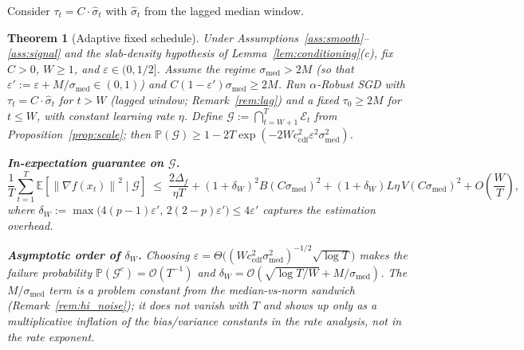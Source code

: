 \documentclass[11pt]{article}
\newtheorem{theorem}{Theorem}
\theoremstyle{definition}
\newcommand{\E}{\mathbb{E}}
\newcommand{\Prob}{\mathbb{P}}
\newcommand{\norm}[1]{\left\| #1 \right\|}
\newcommand{\shat}{\hat{\sigma}}
\begin{document}
Consider $\tau_t = C \cdot \shat_t$ with $\shat_t$ from the lagged median window.

\begin{theorem}[Adaptive fixed schedule]\label{thm:adaptive}
Under Assumptions~\ref{ass:smooth}--\ref{ass:signal} and the slab-density
hypothesis of Lemma~\ref{lem:conditioning}\textup{(c)}, fix $C > 0$, $W \geq 1$,
and $\varepsilon \in (0, 1/2]$. Assume the regime $\sigma_{\mathrm{med}} > 2M$
\textup{(}so that $\varepsilon' := \varepsilon + M/\sigma_{\mathrm{med}} \in (0, 1)$\textup{)}
and $C(1-\varepsilon')\sigma_{\mathrm{med}} \geq 2M$. Run $\alpha$-Robust SGD
with $\tau_t = C \cdot \shat_t$ for $t > W$ \textup{(}lagged window;
Remark~\ref{rem:lag}\textup{)} and a fixed $\tau_0 \geq 2M$ for $t \leq W$,
with constant learning rate $\eta$. Define
$\mathcal G := \bigcap_{t=W+1}^T \mathcal E_t$ from Proposition~\ref{prop:scale};
then $\Prob(\mathcal G) \geq 1 - 2T\exp(-2W c_{\mathrm{cdf}}^2 \varepsilon^2 \sigma_{\mathrm{med}}^2)$.

\medskip
\textbf{In-expectation guarantee on $\mathcal{G}$.}
\begin{equation}\label{eq:adaptive_bound}
  \frac{1}{T}\sum_{t=1}^T \E\!\left[\norm{\nabla f(x_t)}^2 \;\Big|\; \mathcal G\right]
  \;\leq\;
  \frac{2\Delta_f}{\eta T}
  + (1 + \delta_W)^2 B(C\sigma_{\mathrm{med}})^2
  + (1 + \delta_W) L\eta\, V(C\sigma_{\mathrm{med}})^2
  + O\!\left(\frac{W}{T}\right),
\end{equation}
where $\delta_W := \max\bigl(4(p-1)\varepsilon',\, 2(2-p)\varepsilon'\bigr) \leq 4\varepsilon'$
captures the estimation overhead.

\medskip
\textbf{Asymptotic order of $\delta_W$.} Choosing
$\varepsilon = \Theta\!\bigl((W c_{\mathrm{cdf}}^2 \sigma_{\mathrm{med}}^2)^{-1/2}\sqrt{\log T}\bigr)$
makes the failure probability $\Prob(\mathcal G^c) = \mathcal{O}(T^{-1})$ and
$\delta_W = \mathcal O(\sqrt{\log T/W} + M/\sigma_{\mathrm{med}})$. The
$M/\sigma_{\mathrm{med}}$ term is a problem constant from the median-vs-norm
sandwich (Remark~\ref{rem:hi_noise}); it does not vanish with $T$ and shows up
only as a multiplicative inflation of the bias/variance constants in the rate
analysis, not in the rate exponent.
\end{theorem}
\end{document}
